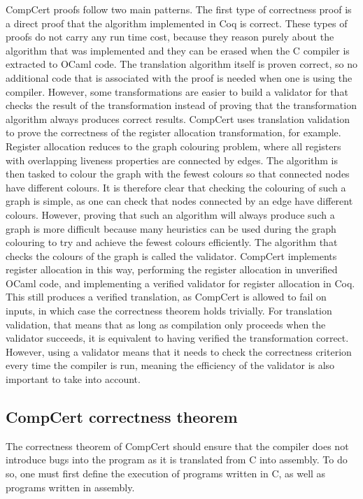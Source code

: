 \gls{CompCert} proofs follow two main patterns.  The first type of correctness
proof is a direct proof that the algorithm implemented in Coq is correct.  These
types of proofs do not carry any run time cost, because they reason purely about
the algorithm that was implemented and they can be erased when the C compiler is
extracted to OCaml code.  The translation algorithm itself is proven correct, so
no additional code that is associated with the proof is needed when one is using
the compiler.  However, some transformations are easier to build a validator for
that checks the result of the transformation instead of proving that the
transformation algorithm always produces correct results.  CompCert uses
translation validation to prove the correctness of the register allocation
transformation, for example.  Register allocation reduces to the graph colouring
problem, where all registers with overlapping liveness properties are connected
by edges.  The algorithm is then tasked to colour the graph with the fewest
colours so that connected nodes have different colours.  It is therefore clear
that checking the colouring of such a graph is simple, as one can check that
nodes connected by an edge have different colours.  However, proving that such
an algorithm will always produce such a graph is more difficult because many
heuristics can be used during the graph colouring to try and achieve the fewest
colours efficiently.  The algorithm that checks the colours of the graph is
called the validator.  CompCert implements register allocation in this way,
performing the register allocation in unverified OCaml code, and implementing a
verified validator for register allocation in Coq.  This still produces a
verified translation, as CompCert is allowed to fail on inputs, in which case
the correctness theorem holds trivially.  For translation validation, that means
that as long as compilation only proceeds when the validator succeeds, it is
equivalent to having verified the transformation correct.  However, using a
validator means that it needs to check the correctness criterion every time the
compiler is run, meaning the efficiency of the validator is also important to
take into account.

\subsection{CompCert correctness theorem}%
\label{sec:bg:compcert-correctness-theorem}

The correctness theorem of CompCert should ensure that the compiler does not
introduce bugs into the program as it is translated from C into assembly.  To do
so, one must first define the execution of programs written in C, as well as
programs written in assembly.


